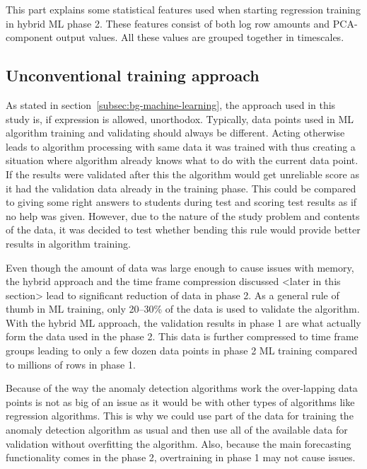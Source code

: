 \begin{itcomment}
    This part explains some statistical features used when starting regression training
    in hybrid ML phase 2.
    These features consist of both log row amounts
    and PCA-component output values.
    All these values are grouped together in timescales.
\end{itcomment}



\subsection{Unconventional training approach}\label{subsec:pipe-unconventional-training}

As stated in section~\ref{subsec:bg-machine-learning},
the approach used in this study is,
if expression is allowed, unorthodox. %
Typically,
data points used in ML algorithm training and validating
should always be different.
Acting otherwise
leads to algorithm processing with
same data it was trained with
thus creating a situation
where algorithm already knows what to do with the current data point.
If the results were validated after this
the algorithm would get unreliable score
as it had the validation data already in the training phase.
This could be compared to
giving some right answers to students
during test and scoring test results as if
no help was given.
However,
due to the nature of the study problem and contents of the data,
it was decided to test whether bending this rule
would provide better results in algorithm training.

Even though the amount of data was large enough
to cause issues with memory,
the hybrid approach and the time frame compression discussed <later in this section> %
lead to significant reduction of data in phase 2.
As a general rule of thumb in ML training,
only 20--30\% of the data is used to validate the algorithm.
With the hybrid ML approach,
the validation results in phase 1
are what actually form the data used in the phase 2.
This data is further compressed to time frame groups
leading to only a few dozen data points in phase 2 ML training %
compared to millions of rows in phase 1.

Because of the way the anomaly detection algorithms work
the over-lapping data points is not as big of an issue
as it would be with other types of algorithms
like regression algorithms. %
This is why we could use part of the data
for training the anomaly detection algorithm as usual
and then use all of the available data for validation
without overfitting the algorithm. %
Also, because the main forecasting functionality comes in the phase 2,
overtraining %
in phase 1 may not cause issues. %

